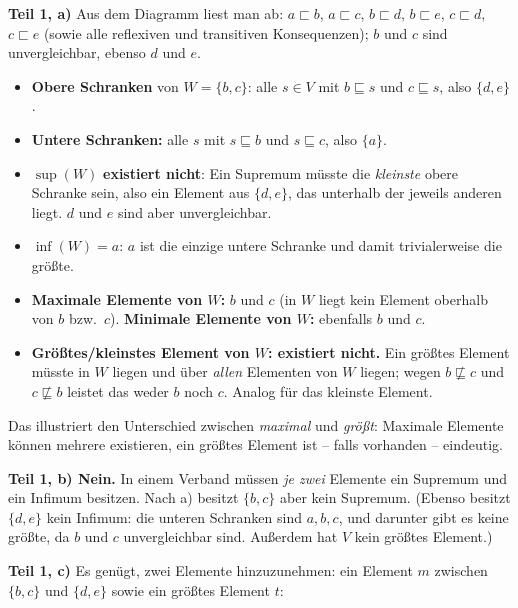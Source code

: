 \begin{loesung}
\textbf{Teil 1, a)} Aus dem Diagramm liest man ab: $a\sqsubset b$, $a\sqsubset c$, $b\sqsubset d$, $b\sqsubset e$, $c\sqsubset d$, $c\sqsubset e$ (sowie alle reflexiven und transitiven Konsequenzen); $b$ und $c$ sind unvergleichbar, ebenso $d$ und $e$.
\begin{itemize}
  \item \textbf{Obere Schranken} von $W=\{b,c\}$: alle $s\in V$ mit $b\sqsubseteq s$ und $c\sqsubseteq s$, also $\{d,e\}$.
  \item \textbf{Untere Schranken:} alle $s$ mit $s\sqsubseteq b$ und $s\sqsubseteq c$, also $\{a\}$.
  \item $\sup(W)$ \textbf{existiert nicht}: Ein Supremum müsste die \emph{kleinste} obere Schranke sein, also ein Element aus $\{d,e\}$, das unterhalb der jeweils anderen liegt. $d$ und $e$ sind aber unvergleichbar.
  \item $\inf(W)=a$: $a$ ist die einzige untere Schranke und damit trivialerweise die größte.
  \item \textbf{Maximale Elemente von $W$:} $b$ und $c$ (in $W$ liegt kein Element oberhalb von $b$ bzw.\ $c$). \textbf{Minimale Elemente von $W$:} ebenfalls $b$ und $c$.
  \item \textbf{Größtes/kleinstes Element von $W$: existiert nicht.} Ein größtes Element müsste in $W$ liegen und über \emph{allen} Elementen von $W$ liegen; wegen $b\not\sqsubseteq c$ und $c\not\sqsubseteq b$ leistet das weder $b$ noch $c$. Analog für das kleinste Element.
\end{itemize}
Das illustriert den Unterschied zwischen \emph{maximal} und \emph{größt}: Maximale Elemente können mehrere existieren, ein größtes Element ist -- falls vorhanden -- eindeutig.

\textbf{Teil 1, b) Nein.} In einem Verband müssen \emph{je zwei} Elemente ein Supremum und ein Infimum besitzen. Nach a) besitzt $\{b,c\}$ aber kein Supremum. (Ebenso besitzt $\{d,e\}$ kein Infimum: die unteren Schranken sind $a,b,c$, und darunter gibt es keine größte, da $b$ und $c$ unvergleichbar sind. Außerdem hat $V$ kein größtes Element.)

\textbf{Teil 1, c)} Es genügt, zwei Elemente hinzuzunehmen: ein Element $m$ zwischen $\{b,c\}$ und $\{d,e\}$ sowie ein größtes Element $t$:

\begin{center}
\end{center}


\end{loesung}
